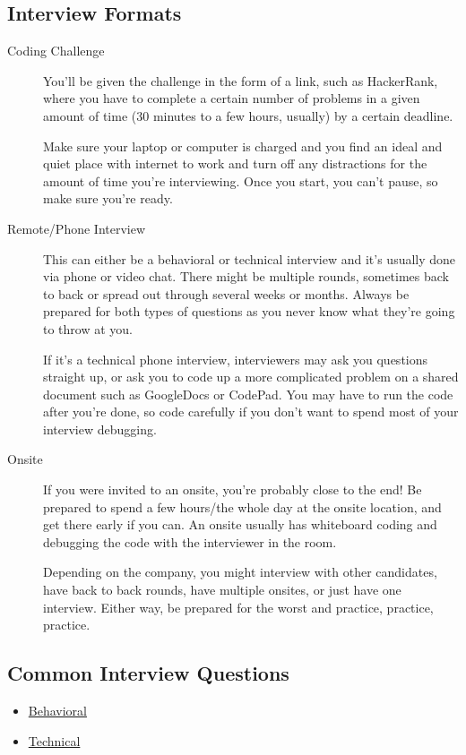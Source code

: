 \documentclass{article}
\begin{document}
\subsection {Interview Formats}
\begin{description}
\item[Coding Challenge]
  You'll be given the challenge in the form of a link, such as HackerRank, where
  you have to complete a certain number of problems in a given amount of time
  (30 minutes to a few hours, usually) by a certain deadline.

  Make sure your laptop or computer is charged and you find an ideal and quiet
  place with internet to work and turn off any distractions for the amount of
  time you're interviewing. Once you start, you can't pause, so make sure you're
  ready.
\item[Remote/Phone Interview]
  This can either be a behavioral or technical interview and it's usually done
  via phone or video chat. There might be multiple rounds, sometimes back to
  back or spread out through several weeks or months. Always be prepared for
  both types of questions as you never know what they're going to throw at you.

  If it's a technical phone interview, interviewers may ask you questions
  straight up, or ask you to code up a more complicated problem on a shared
  document such as GoogleDocs or CodePad. You may have to run the code after
  you're done, so code carefully if you don't want to spend most of your
  interview debugging.
\item[Onsite]
  If you were invited to an onsite, you're probably close to the end! Be
  prepared to spend a few hours/the whole day at the onsite location, and get
  there early if you can. An onsite usually has whiteboard coding and debugging
  the code with the interviewer in the room.

  Depending on the company, you might interview with other candidates, have back
  to back rounds, have multiple onsites, or just have one interview. Either way,
  be prepared for the worst and practice, practice, practice.
\end{description}

\subsection{Common Interview Questions}
\begin{itemize}
    \item \href{http://www.forbes.com/sites/jacquelynsmith/2013/01/11/how-to-ace-the-50-most-common-interview-questions/#f57f0c348737}{Behavioral} 
    \item \href{https://www.reddit.com/r/cscareerquestions/comments/20ahfq/heres_a_pretty_big_list_of_programming_interview/}{Technical}
\end{itemize}
\end{document}
